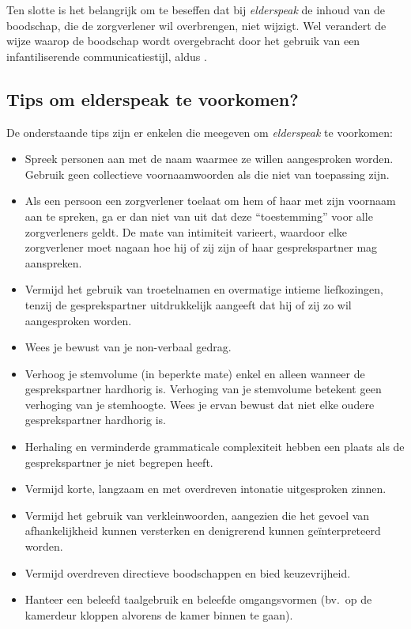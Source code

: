 Ten slotte is het belangrijk om te beseffen dat bij \textit{elderspeak} de inhoud van de boodschap, die de zorgverlener wil overbrengen, niet wijzigt. Wel verandert de wijze waarop de boodschap wordt overgebracht door het gebruik van een infantiliserende communicatiestijl, aldus \textcite{Campens2021}.

\subsection{Tips om elderspeak te voorkomen?}

De onderstaande tips zijn er enkelen die \textcite{Wick2007} meegeven om \textit{elderspeak} te voorkomen:

\begin{itemize}
    \item Spreek personen aan met de naam waarmee ze willen aangesproken worden. Gebruik geen collectieve voornaamwoorden als die niet van toepassing zijn.
    \item Als een persoon een zorgverlener toelaat om hem of haar met zijn voornaam aan te spreken, ga er dan niet van uit dat deze “toestemming” voor alle zorgverleners geldt. De mate van intimiteit varieert, waardoor elke zorgverlener moet nagaan hoe hij of zij zijn of haar gesprekspartner mag aanspreken.
    \item Vermijd het gebruik van troetelnamen en overmatige intieme liefkozingen, tenzij de gesprekspartner uitdrukkelijk aangeeft dat hij of zij zo wil aangesproken worden.
    \item Wees je bewust van je non-verbaal gedrag.
    \item Verhoog je stemvolume (in beperkte mate) enkel en alleen wanneer de gesprekspartner hardhorig is. Verhoging van je stemvolume betekent geen verhoging van je stemhoogte. Wees je ervan bewust dat niet elke oudere gesprekspartner hardhorig is.
    \item Herhaling en verminderde grammaticale complexiteit hebben een plaats als de gesprekspartner je niet begrepen heeft.
    \item Vermijd korte, langzaam en met overdreven intonatie uitgesproken zinnen.
    \item Vermijd het gebruik van verkleinwoorden, aangezien die het gevoel van afhankelijkheid kunnen versterken en denigrerend kunnen geïnterpreteerd worden.
    \item Vermijd overdreven directieve boodschappen en bied keuzevrijheid.
    \item Hanteer een beleefd taalgebruik en beleefde omgangsvormen (bv.\ op de kamerdeur kloppen alvorens de kamer binnen te gaan).
\end{itemize}

